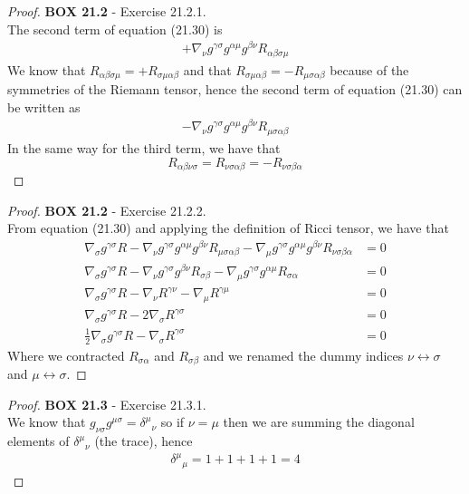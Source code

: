 \documentclass[11pt]{article}
\theoremstyle{definition}
\begin{document}
\cleardoublepage
\begin{proof}{\textbf{BOX 21.2} - Exercise 21.2.1.}\\
The second term of equation (21.30) is
\begin{align*}
    + \nabla_\nu g^{\gamma\sigma} g^{\alpha\mu} g^{\beta\nu} R_{\alpha\beta\sigma\mu}
\end{align*}
We know that $R_{\alpha\beta\sigma\mu} = + R_{\sigma\mu\alpha\beta}$
and that $R_{\sigma\mu\alpha\beta} = -R_{\mu\sigma\alpha\beta}$ because of 
the symmetries of the Riemann tensor, hence the second term of equation (21.30)
can be written as
\begin{align*}
    - \nabla_\nu g^{\gamma\sigma} g^{\alpha\mu} g^{\beta\nu} R_{\mu\sigma\alpha\beta}
\end{align*}
In the same way for the third term, we have that
$$R_{\alpha\beta\nu\sigma} = R_{\nu\sigma\alpha\beta}
= -R_{\nu\sigma\beta\alpha}$$
\end{proof}
\begin{proof}{\textbf{BOX 21.2} - Exercise 21.2.2.}\\
From equation (21.30) and applying the definition of Ricci tensor, we have that
\begin{align*}
    \nabla_{\sigma} g^{\gamma\sigma} R
    - \nabla_\nu g^{\gamma\sigma} g^{\alpha\mu} g^{\beta\nu} R_{\mu\sigma\alpha\beta}
    - \nabla_\mu g^{\gamma\sigma} g^{\alpha\mu} g^{\beta\nu} R_{\nu\sigma\beta\alpha}
    &= 0 \\
    \nabla_{\sigma} g^{\gamma\sigma} R
    - \nabla_\nu g^{\gamma\sigma} g^{\beta\nu} R_{\sigma\beta}
    - \nabla_\mu g^{\gamma\sigma} g^{\alpha\mu} R_{\sigma\alpha}
    &= 0 \\
    \nabla_{\sigma} g^{\gamma\sigma} R
    - \nabla_\nu R^{\gamma\nu}
    - \nabla_\mu R^{\gamma\mu}
    &= 0 \\
    \nabla_{\sigma} g^{\gamma\sigma} R
    - 2\nabla_\sigma R^{\gamma\sigma}
    &= 0 \\
    \frac{1}{2}\nabla_{\sigma} g^{\gamma\sigma} R
    - \nabla_\sigma R^{\gamma\sigma}
    &= 0
\end{align*}
Where we contracted $R_{\sigma\alpha}$ and $R_{\sigma\beta}$ and we renamed the
dummy indices $\nu \leftrightarrow \sigma$ and $\mu \leftrightarrow \sigma$.
\end{proof}

\cleardoublepage
\begin{proof}{\textbf{BOX 21.3} - Exercise 21.3.1.}\\
We know that $g_{\nu\sigma} g^{\mu\sigma} ={\delta^\mu}_\nu$ so if $\nu = \mu$
then we are summing the diagonal elements of ${\delta^\mu}_\nu$ (the trace),
hence
\begin{align*}
    {\delta^{\mu}}_\mu = 1 + 1 + 1 + 1 = 4
\end{align*}
\end{proof}
\end{document}

